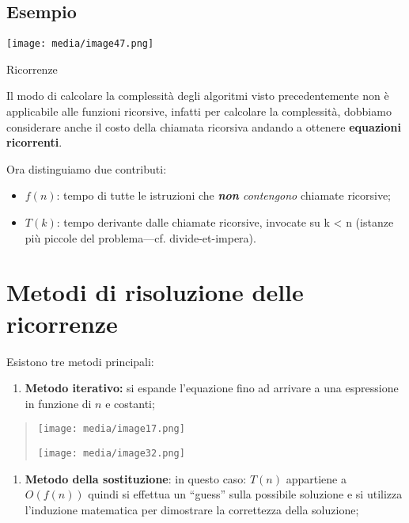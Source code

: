 \subsection{Esempio}\label{esempio}

\texttt{[image: media/image47.png]}

Ricorrenze

Il modo di calcolare la complessità degli algoritmi visto
precedentemente non è applicabile alle funzioni ricorsive, infatti per
calcolare la complessità, dobbiamo considerare anche il costo della
chiamata ricorsiva andando a ottenere \textbf{equazioni ricorrenti}.

Ora distinguiamo due contributi:

\begin{itemize}
\item
  \(f(n)\): tempo di tutte le istruzioni che \emph{\textbf{non}
  contengono} chiamate ricorsive;
\item
  \(T(k)\): tempo derivante dalle chiamate ricorsive, invocate su k
  \textless{} n (istanze più piccole del problema---cf.
  divide-et-impera).
\end{itemize}

\section{Metodi di risoluzione delle
ricorrenze}\label{metodi-di-risoluzione-delle-ricorrenze}

Esistono tre metodi principali:

\begin{enumerate}
\def\labelenumi{\arabic{enumi}.}
\item
  \textbf{Metodo iterativo:} si espande l'equazione fino ad arrivare a
  una espressione in funzione di \(n\) e costanti;
\end{enumerate}

\begin{quote}
\texttt{[image: media/image17.png]}

\texttt{[image: media/image32.png]}
\end{quote}

\begin{enumerate}
\def\labelenumi{\arabic{enumi}.}
\setcounter{enumi}{1}
\item
  \textbf{Metodo della sostituzione}: in questo caso: \(T(n)\)
  appartiene a \(O(f(n))\) quindi si effettua un ``guess'' sulla
  possibile soluzione e si utilizza l'induzione matematica per
  dimostrare la correttezza della soluzione;
\end{enumerate}

